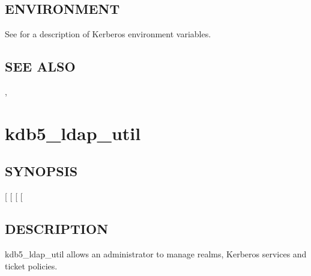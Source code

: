 \documentclass[letterpaper,10pt,english]{sphinxmanual}
\begin{document}
\subsection{ENVIRONMENT}
\label{\detokenize{admin/admin_commands/kdb5_util:environment}}
See  for a description of Kerberos environment
variables.


\subsection{SEE ALSO}
\label{\detokenize{admin/admin_commands/kdb5_util:see-also}}
{\hyperref[\detokenize{admin/admin_commands/kadmin_local:kadmin-1}]{}}, 


\section{kdb5\_ldap\_util}
\label{\detokenize{admin/admin_commands/kdb5_ldap_util:kdb5-ldap-util-8}}\label{\detokenize{admin/admin_commands/kdb5_ldap_util::doc}}\label{\detokenize{admin/admin_commands/kdb5_ldap_util:kdb5-ldap-util}}

\subsection{SYNOPSIS}
\label{\detokenize{admin/admin_commands/kdb5_ldap_util:synopsis}}\label{\detokenize{admin/admin_commands/kdb5_ldap_util:kdb5-ldap-util-synopsis}}
{[}  {[} \sphinxstyleemphasis{passwd}{]}{]}
{[} \sphinxstyleemphasis{ldapuri}{]}
{[}\sphinxstyleemphasis{command\_options}{]}


\subsection{DESCRIPTION}
\label{\detokenize{admin/admin_commands/kdb5_ldap_util:kdb5-ldap-util-synopsis-end}}\label{\detokenize{admin/admin_commands/kdb5_ldap_util:description}}
kdb5\_ldap\_util allows an administrator to manage realms, Kerberos
services and ticket policies.
\end{document}
